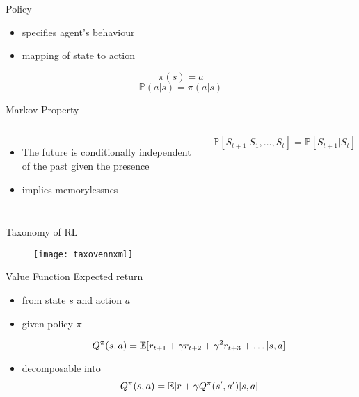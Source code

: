 \begin{frame}[fragile]{Policy}
\begin{itemize}
    \item specifies agent's behaviour
    \item mapping of state to action
\end{itemize}
\begin{equation*}
    \pi(s)= a
\end{equation*}
\begin{equation*}
    \mathbb{P}(a|s)= \pi(a|s)
\end{equation*}
\end{frame}

\begin{frame}[fragile]{Markov Property}
    \begin{columns}
        \begin{itemize}
            \item The future is conditionally independent of the past given the presence
            \item implies memorylessnes 
        \end{itemize}
\begin{equation*}
    \mathbb{P}[S_{t+1}|S_{1},\ldots,S_{t}]=\mathbb{P}[S_{t+1}|S_{t}] 
\end{equation*}
\end{columns}
\end{frame}

\begin{frame}[fragile]{Taxonomy of RL}
 \begin{figure}[h]
\texttt{[image: taxovennxml]}
\end{figure} 
\end{frame}

\begin{frame}{Value Function}
    Expected return
      \begin{itemize}
        \item from state $s$ and  action $a$ 
        \item given policy $\pi$

      \begin{equation*}
        Q^{\pi}(s,a)=\operatorname{\mathbb{E}} [r_{t+1}+ \gamma r_{t+2}+\gamma^2 r_{t+3}+\ldots|s,a]
      \end{equation*}

      \item decomposable into
      \begin{equation*}
        Q^{\pi}(s,a)=\operatorname{\mathbb{E}} [r+\gamma Q^{\pi}(s', a')|s,a]
      \end{equation*}
      \end{itemize}
\end{frame}

